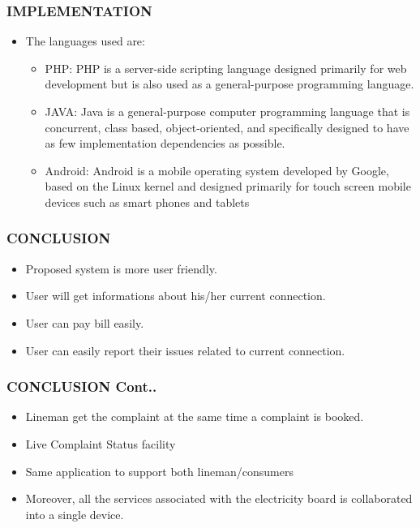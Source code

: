 \documentclass{beamer} %
\theoremstyle{definition} %
\begin{document}
\begin{frame}
\frametitle{IMPLEMENTATION}
\begin{itemize}
\item The languages used are:
\begin{itemize}
	\item PHP: PHP is a server-side scripting language designed primarily for web development but is also used as a general-purpose programming language.
	\item JAVA: Java is a general-purpose computer programming language that is concurrent, class based, object-oriented, and speciﬁcally designed to have as few implementation dependencies as possible.
	\item Android: Android is a mobile operating system developed by Google, based on the Linux kernel and designed primarily for touch screen mobile devices such as smart phones and tablets
\end{itemize}
\end{itemize}
\end{frame}
\begin{frame}
\frametitle {CONCLUSION }
\begin{itemize}
	\item Proposed system is more user friendly.
	\item User will get informations about his/her current connection.
	\item User can pay bill easily.
	\item User can easily report their issues related to current connection.
	
	
\end{itemize}
\end{frame}


\begin{frame}
\frametitle {CONCLUSION Cont.. }
\begin{itemize}
	\item Lineman get the complaint at the same time a complaint is booked.
	\item Live Complaint Status facility
	\item Same application to support both lineman/consumers
	\item Moreover, all the services associated with the electricity board is collaborated into a single device.
		
	
\end{itemize}
\end{frame}
\end{document}
